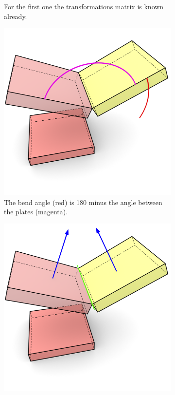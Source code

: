 \documentclass[../ClassicThesis.tex]{subfiles}
\begin{document}
\begin{figure}[h]
\begin{subfigure}[b]{0.49\textwidth}
    \caption{For the first one the transformations matrix is known already.}
    \label{fig:bend-matrix:2}
  \end{subfigure}
  \begin{subfigure}[b]{0.49\textwidth}
    \centering
    \includegraphics[width=\textwidth]{07-traversing_along_bend_connections_03}
    \caption{The bend angle (red) is 180\textdegree{} minus the angle between the plates (magenta).}
    \label{fig:bend-matrix:3}
  \end{subfigure}
  \begin{subfigure}[b]{0.49\textwidth}
    \centering
    \includegraphics[width=1\textwidth]{07-traversing_along_bend_connections_05}

\end{subfigure}
\end{figure}
\end{document}
